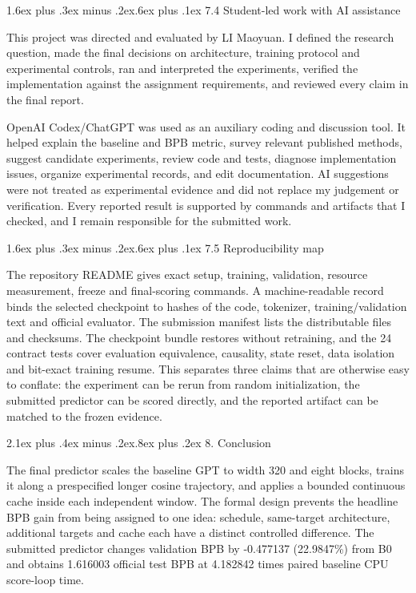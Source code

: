 \documentclass[11pt]{article}
\makeatletter
\renewcommand\section{\@startsection{section}{1}{0pt}%
  {2.1ex plus .4ex minus .2ex}{.8ex plus .2ex}%
  {\normalfont\large\bfseries}}
\renewcommand\subsection{\@startsection{subsection}{2}{0pt}%
  {1.6ex plus .3ex minus .2ex}{.6ex plus .1ex}%
  {\normalfont\normalsize\bfseries}}
\makeatother
\begin{document}
\subsection{7.4 Student-led work with AI
assistance}\label{74-student-led-work-with-ai-assistance}

This project was directed and evaluated by LI Maoyuan. I defined the
research question, made the final decisions on architecture, training
protocol and experimental controls, ran and interpreted the experiments,
verified the implementation against the assignment requirements, and
reviewed every claim in the final report.

OpenAI Codex/ChatGPT was used as an auxiliary coding and discussion tool.
It helped explain the baseline and BPB metric, survey relevant published
methods, suggest candidate experiments, review code and tests, diagnose
implementation issues, organize experimental records, and edit
documentation. AI suggestions were not treated as experimental evidence
and did not replace my judgement or verification. Every reported result
is supported by commands and artifacts that I checked, and I remain
responsible for the submitted work.

\subsection{7.5 Reproducibility map}\label{75-reproducibility-map}

The repository README gives exact setup, training, validation, resource
measurement, freeze and final-scoring commands. A machine-readable record
binds the selected checkpoint to hashes of the code, tokenizer,
training/validation text and official evaluator. The submission manifest
lists the distributable files and checksums. The checkpoint bundle
restores without retraining, and the 24 contract tests
cover evaluation equivalence, causality, state reset, data isolation and
bit-exact training resume. This separates three claims that are otherwise
easy to conflate: the experiment can be rerun from random initialization,
the submitted predictor can be scored directly, and the reported artifact
can be matched to the frozen evidence.

\section{8. Conclusion}\label{8-conclusion}

The final predictor scales the baseline GPT to width 320 and eight
blocks, trains it along a prespecified longer cosine trajectory, and
applies a bounded continuous cache inside each independent window. The
formal design prevents the headline BPB gain from being assigned to one
idea: schedule, same-target architecture, additional targets and cache
each have a distinct controlled difference. The submitted predictor
changes validation BPB by -0.477137 (22.9847\%) from B0 and obtains
1.616003 official test BPB at 4.182842 times paired baseline CPU
score-loop time.
\end{document}
